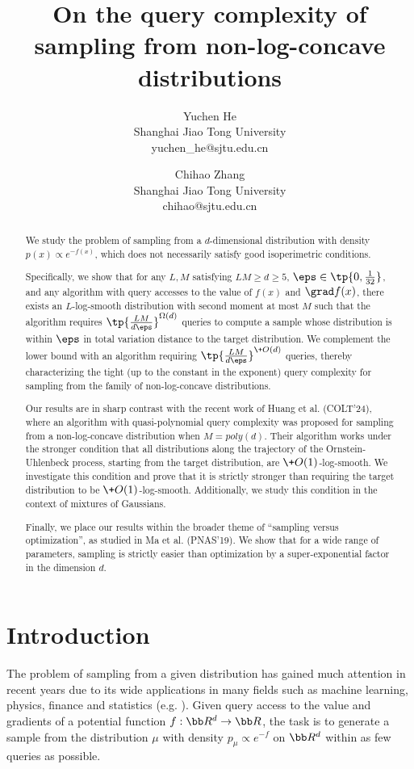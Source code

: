 \documentclass[11pt,a4paper]{article}
\title{On the query complexity of sampling from non-log-concave distributions}
\author{Yuchen He\\Shanghai Jiao Tong University \\ \textsf{yuchen\_he@sjtu.edu.cn} \and Chihao Zhang \\Shanghai Jiao Tong University \\ \textsf{chihao@sjtu.edu.cn}}
\begin{document}
\maketitle

\begin{abstract}
    We study the problem of sampling from a $d$-dimensional distribution with density $p(x)\propto e^{-f(x)}$, which does not necessarily satisfy good isoperimetric conditions.

    Specifically, we show that for any $L,M$ satisfying $LM\ge d\ge 5$, $\eps\in \tp{0,\frac{1}{32}}$, and any algorithm with query accesses to the value of $f(x)$ and $\grad f(x)$, there exists an $L$-log-smooth distribution with second moment at most $M$ such that the algorithm requires $\tp{\frac{LM}{d\eps}}^{\Omega(d)}$ queries to compute a sample whose distribution is within $\eps$ in total variation distance to the target distribution. We complement the lower bound with an algorithm requiring $\tp{\frac{LM}{d\eps}}^{\+O(d)}$ queries, thereby characterizing the tight (up to the constant in the exponent) query complexity for sampling from the family of non-log-concave distributions.

    Our results are in sharp contrast with the recent work of Huang et al. (COLT'24), where an algorithm with quasi-polynomial query complexity was proposed for sampling from a non-log-concave distribution when $M=\!{poly}(d)$. Their algorithm works under the stronger condition that all distributions along the trajectory of the Ornstein-Uhlenbeck process, starting from the target distribution, are $\+O(1)$-log-smooth. We investigate this condition and prove that it is strictly stronger than requiring the target distribution to be $\+O(1)$-log-smooth. Additionally, we study this condition in the context of mixtures of Gaussians.

    Finally, we place our results within the broader theme of ``sampling versus optimization'', as studied in Ma et al. (PNAS'19). We show that for a wide range of parameters, sampling is strictly easier than optimization by a super-exponential factor in the dimension $d$.

\end{abstract}


\setcounter{tocdepth}{1}
\tableofcontents


\newpage

\section{Introduction}
The problem of sampling from a given distribution has gained much attention in recent years due to its  wide applications in many fields such as machine learning, physics, finance and statistics (e.g. \cite{ADDJ03,K06,D07,LB21}). Given query access to the value and gradients of a potential function $f:\bb R^d\to \bb R$, the task is to generate a sample from the distribution $\mu$ with density $p_\mu\propto e^{-f}$ on $\bb R^d$ within as few queries as possible.
\end{document}
